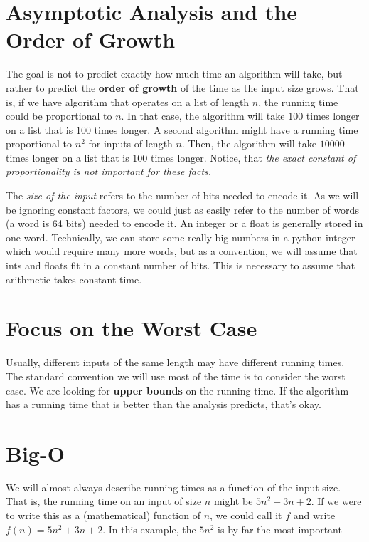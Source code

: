\section{Asymptotic Analysis and the Order of Growth}


The goal is not to predict exactly how much time an algorithm will take, but rather to predict the \textbf{order of growth} of the time as the input size grows.
That is, if we have algorithm that operates on a list of length $n$, the running time could be proportional to $n$.
In that case, the algorithm will take $100$ times longer on a list that is $100$ times longer.
A second algorithm might have a running time proportional to $n^2$ for inputs of length $n$.
Then, the algorithm will take $10000$ times longer on a list that is $100$ times longer.
Notice, that \emph{the exact constant of proportionality is not important for these facts.}


The \emph{size of the input} refers to the number of bits needed to encode it.
As we will be ignoring constant factors, we could just as easily refer to the number of words (a word is 64 bits) needed to encode it.
An integer or a float is generally stored in one word.
Technically, we can store some really big numbers in a python integer which would require many more words, but as a convention, we will assume that ints and floats fit in a constant number of bits.
This is necessary to assume that arithmetic takes constant time.

\section{Focus on the Worst Case}


Usually, different inputs of the same length may have different running times.
The standard convention we will use most of the time is to consider the worst case.
We are looking for \textbf{upper bounds} on the running time.
If the algorithm has a running time that is better than the analysis predicts, that's okay.

\section{Big-O}


We will almost always describe running times as a function of the input size.
That is, the running time on an input of size $n$ might be $5n^2 + 3n + 2$.
If we were to write this as a (mathematical) function of $n$, we could call it $f$ and write $f(n) = 5n^2 + 3n + 2$.
In this example, the $5n^2$ is by far the most important


